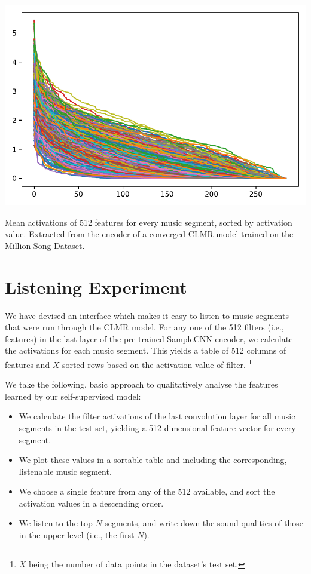 \begin{marginfigure}
    \includegraphics[width=\textwidth]{figs/activations_msd.pdf}
    \caption{Mean activations of 512 features for every music segment, sorted by activation value. Extracted from the encoder of a converged CLMR model trained on the Million Song Dataset.}
    \label{fig:msd_activations}
\end{marginfigure}

\section{Listening Experiment}
We have devised an interface which makes it easy to listen to music segments that were run through the CLMR model.
For any one of the 512 filters (i.e., features) in the last layer of the pre-trained SampleCNN encoder, we calculate the activations for each music segment.
This yields a table of 512 columns of features and $X$ sorted rows based on the activation value of filter.
\footnote{$X$ being the number of data points in the dataset's test set.}

We take the following, basic approach to qualitatively analyse the features learned by our self-supervised model:
\begin{itemize}
    \item We calculate the filter activations of the last convolution layer for all music segments in the test set, yielding a 512-dimensional feature vector for every segment.
    \item We plot these values in a sortable table and including the corresponding, listenable music segment.
    \item We choose a single feature from any of the 512 available, and sort the activation values in a descending order.
    \item We listen to the top-$N$ segments, and write down the sound qualities of those in the upper level (i.e., the first $N$).
\end{itemize}

